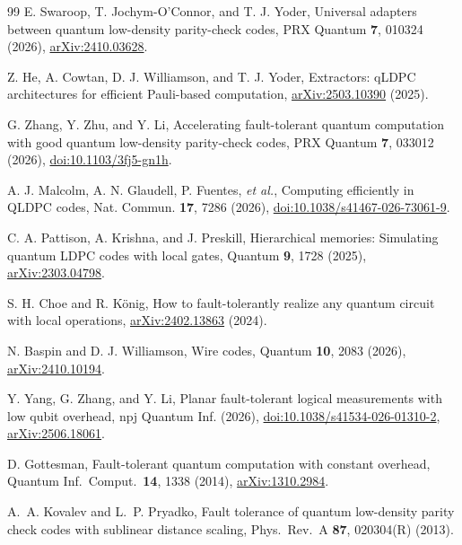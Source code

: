 \begin{thebibliography}{99}
E. Swaroop, T. Jochym-O'Connor, and T. J. Yoder, Universal adapters between quantum low-density parity-check codes, PRX Quantum \textbf{7}, 010324 (2026), \href{https://arxiv.org/abs/2410.03628}{arXiv:2410.03628}.

Z. He, A. Cowtan, D. J. Williamson, and T. J. Yoder, Extractors: qLDPC architectures for efficient Pauli-based computation, \href{https://arxiv.org/abs/2503.10390}{arXiv:2503.10390} (2025).

G. Zhang, Y. Zhu, and Y. Li, Accelerating fault-tolerant quantum computation with good quantum low-density parity-check codes, PRX Quantum \textbf{7}, 033012 (2026), \href{https://doi.org/10.1103/3fj5-gn1h}{doi:10.1103/3fj5-gn1h}.

A. J. Malcolm, A. N. Glaudell, P. Fuentes, \emph{et al.}, Computing efficiently in QLDPC codes, Nat. Commun. \textbf{17}, 7286 (2026), \href{https://doi.org/10.1038/s41467-026-73061-9}{doi:10.1038/s41467-026-73061-9}.

C. A. Pattison, A. Krishna, and J. Preskill, Hierarchical memories: Simulating quantum LDPC codes with local gates, Quantum \textbf{9}, 1728 (2025), \href{https://arxiv.org/abs/2303.04798}{arXiv:2303.04798}.

S. H. Choe and R. K\"onig, How to fault-tolerantly realize any quantum circuit with local operations, \href{https://arxiv.org/abs/2402.13863}{arXiv:2402.13863} (2024).

N. Baspin and D. J. Williamson, Wire codes, Quantum \textbf{10}, 2083 (2026), \href{https://arxiv.org/abs/2410.10194}{arXiv:2410.10194}.

Y. Yang, G. Zhang, and Y. Li, Planar fault-tolerant logical measurements with low qubit overhead, npj Quantum Inf. (2026), \href{https://doi.org/10.1038/s41534-026-01310-2}{doi:10.1038/s41534-026-01310-2}, \href{https://arxiv.org/abs/2506.18061}{arXiv:2506.18061}.

D. Gottesman, Fault-tolerant quantum computation with constant overhead, Quantum Inf.\ Comput.\ \textbf{14}, 1338 (2014), \href{https://arxiv.org/abs/1310.2984}{arXiv:1310.2984}.

A.~A. Kovalev and L.~P. Pryadko, Fault tolerance of quantum low-density parity check codes with sublinear distance scaling, Phys.\ Rev.\ A \textbf{87}, 020304(R) (2013).


\end{thebibliography}
